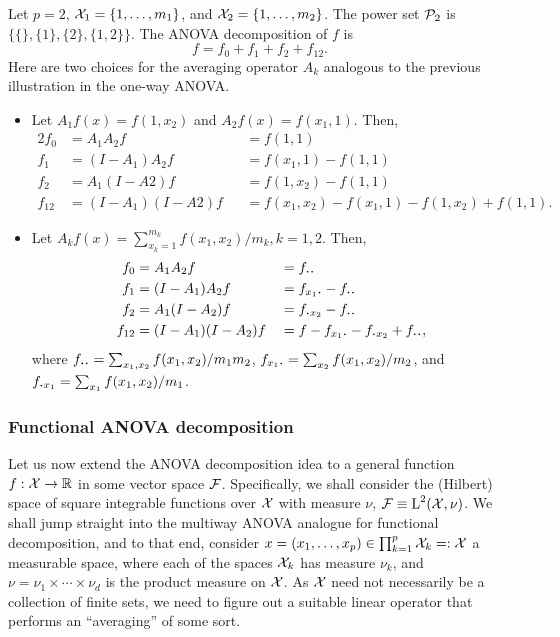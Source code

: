 \begin{example}
  Let $p=2$, ${\mathcal X}_1=\{1,\dots,m_1\}$, and ${\mathcal X}_2=\{1,\dots,m_2\}$.
  The power set ${\mathcal P}_2$ is $\big\{ \{\}, \{1\}, \{2\}, \{1,2\} \big\}$.
  The ANOVA decomposition of $f$ is
  \[
    f = f_0 + f_1 + f_2 + f_{12}.
  \]
  Here are two choices for the averaging operator $A_k$ analogous to the previous illustration in the one-way ANOVA.
  \begin{itemize}
    \item Let $A_1f(x) = f(1,x_2)$ and $A_2f(x) = f(x_1,1)$. Then,
    \begin{alignat*}{2}
      f_0 &= A_1A_2 f          &&= f(1,1) \\
      f_1 &= (I-A_1)A_2f       &&= f(x_1,1) - f(1,1) \\
      f_2 &= A_1(I-A2)f        &&= f(1,x_2) - f(1,1) \\
      f_{12} &= (I-A_1)(I-A2)f &&= f(x_1,x_2) - f(x_1,1) - f(1,x_2) + f(1,1).
    \end{alignat*}
    \item Let $A_kf(x) = \sum_{x_k=1}^{m_k} f(x_1,x_2) / m_k, k=1,2$. Then,
    \begin{alignat*}{2}
      f_0 &= A_1A_2 f          &&= f_{\bigcdot\bigcdot} \\
      f_1 &= (I-A_1)A_2f       &&= f_{x_1\bigcdot} - f_{\bigcdot\bigcdot} \\
      f_2 &= A_1(I-A_2)f        &&= f_{\bigcdot x_2} - f_{\bigcdot\bigcdot} \\
      f_{12} &= (I-A_1)(I-A_2)f &&= f - f_{x_1\bigcdot} - f_{\bigcdot x_2} + f_{\bigcdot\bigcdot},
    \end{alignat*}
    where $f_{\bigcdot\bigcdot} = \sum_{x_1,x_2} f(x_1,x_2) / m_1m_2$, $ f_{x_1\bigcdot} = \sum_{x_2} f(x_1,x_2)/m_2$, and \newline $f_{\bigcdot x_1} = \sum_{x_1} f(x_1,x_2)/m_1$.
  \end{itemize}
\end{example}

\subsubsection{Functional ANOVA decomposition}
\vspace{-5pt}
Let us now extend the ANOVA decomposition idea to a general function $f:{\mathcal X}\to\mathbb{R}$ in some vector space ${\mathcal F}$.
Specifically, we shall consider the (Hilbert) space of square integrable functions over ${\mathcal X}$ with measure $\nu$, ${\mathcal F} \equiv \text{L}^2({\mathcal X},\nu)$.
We shall jump straight into the multiway ANOVA analogue for functional decomposition, and to that end, consider $x=(x_1,\dots,x_p) \in \prod_{k=1}^p {\mathcal X}_k =: {\mathcal X}$ a measurable space, where each of the spaces ${\mathcal X}_k$ has measure $\nu_k$, and $\nu=\nu_1\times\cdots\times\nu_d$ is the product measure on ${\mathcal X}$.
As ${\mathcal X}$ need not necessarily be a collection of finite sets, we need to figure out a suitable linear operator that performs an ``averaging'' of some sort.

